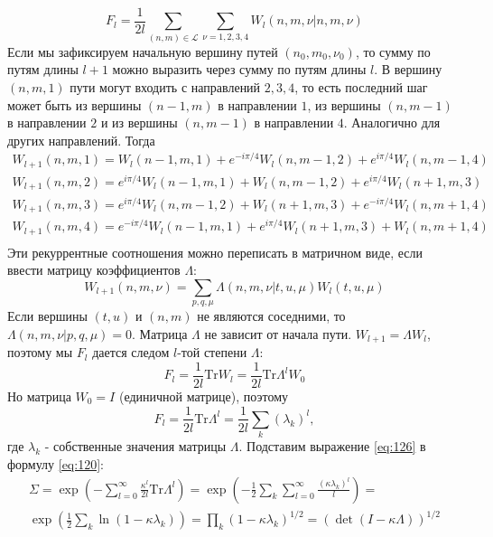 \documentclass[a4paper,12pt]{article}
\theoremstyle{definition}
\theoremstyle{definition}
\theoremstyle{definition}
\begin{document}
\begin{equation}
  \label{eq:121}
  F_l=\frac{1}{2l}\sum_{(n,m)\in \mathcal{L}} \sum_{\nu=1,2,3,4} W_l(n,m,\nu|n,m,\nu)
\end{equation}
Если мы зафиксируем начальную вершину путей $(n_0,m_0,\nu_0)$, то сумму по путям длины $l+1$ можно выразить через сумму по путям длины $l$. В вершину $(n,m,1)$ пути могут входить с направлений $2,3,4$, то есть последний шаг может быть из вершины $(n-1,m)$ в направлении $1$, из вершины $(n,m-1)$ в направлении $2$ и из вершины $(n,m-1)$ в направлении $4$.
Аналогично для других направлений. Тогда
\begin{equation}
  \label{eq:122}
\begin{array}{l}
W_{l+1}(n,m,1)=W_l(n-1,m,1)+e^{-i\pi/4} W_l(n,m-1,2)+e^{i\pi/4}W_l(n,m-1,4)\\
W_{l+1}(n,m,2)=e^{i\pi/4}W_l(n-1,m,1)+W_l(n,m-1,2)+e^{i\pi/4}W_l(n+1,m,3)\\
W_{l+1}(n,m,3)=e^{i\pi/4}W_l(n,m-1,2)+W_l(n+1,m,3)+e^{-i\pi/4}W_l(n,m+1,4)\\
W_{l+1}(n,m,4)=e^{-i\pi/4}W_l(n-1,m,1)+e^{i\pi/4}W_l(n+1,m,3)+W_l(n,m+1,4)\\
\end{array}
\end{equation}
Эти рекуррентные соотношения можно переписать в матричном виде, если ввести матрицу коэффициентов $\Lambda$:
\begin{equation}
  \label{eq:124}
  W_{l+1}(n,m,\nu)=\sum_{p,q,\mu}\Lambda(n,m,\nu|t,u,\mu) W_l(t,u,\mu)
\end{equation}
Если вершины $(t,u)$ и $(n,m)$ не являются соседними, то $\Lambda(n,m,\nu|p,q,\mu)=0$. Матрица $\Lambda$ не зависит от начала пути. $W_{l+1}=\Lambda W_l$, поэтому мы $F_l$ дается следом $l$-той степени $\Lambda$:
\begin{equation}
  \label{eq:125}
  F_l=\frac{1}{2l}\mathrm{Tr} W_l=\frac{1}{2l}\mathrm{Tr} \Lambda^l W_0
\end{equation}
Но матрица $W_0=I$ (единичной матрице), поэтому
\begin{equation}
  \label{eq:126}
  F_l=\frac{1}{2l}\mathrm{Tr} \Lambda^l =\frac{1}{2l} \sum_k (\lambda_k)^l,
\end{equation}
где $\lambda_k$ - собственные значения матрицы $\Lambda$. Подставим выражение \eqref{eq:126} в формулу \eqref{eq:120}:
\begin{multline}
  \label{eq:127}
  \Sigma=\exp\left(-\sum_{l=0}^{\infty} \frac{\kappa^l}{2l}\mathrm{Tr}\Lambda^l\right)=\exp\left(-\frac{1}{2}\sum_k \sum_{l=0}^{\infty} \frac{(\kappa\lambda_k)^l}{l}\right)=\\
  \exp\left(\frac{1}{2}\sum_k \ln(1-\kappa\lambda_k)\right)=\prod_k(1-\kappa\lambda_k)^{1/2}=(\det(I-\kappa\Lambda))^{1/2}
\end{multline}
\end{document}
